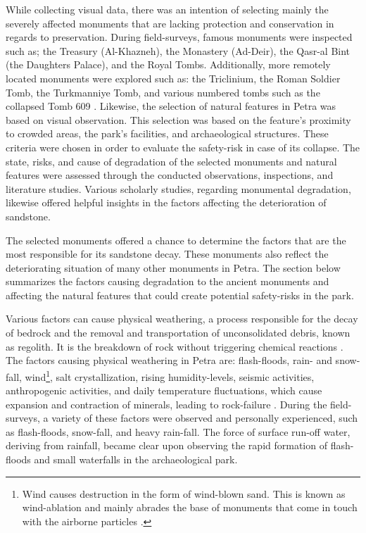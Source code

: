 While collecting visual data, there was an intention of selecting mainly the severely affected monuments that are lacking protection and conservation in regards to preservation.
During field-surveys, famous monuments were inspected such as; the Treasury (Al-Khazneh), the Monastery (Ad-Deir), the Qasr-al Bint (the Daughters Palace), and the Royal Tombs.
Additionally, more remotely located monuments were explored such as: the Triclinium, the Roman Soldier Tomb, the Turkmanniye Tomb, and various numbered tombs such as the collapsed Tomb 609 .
Likewise, the selection of natural features in Petra was based on visual observation. This selection was based on the feature’s proximity to crowded areas, the park’s facilities, and archaeological structures.
These criteria were chosen in order to evaluate the safety-risk in case of its collapse.
The state, risks, and cause of degradation of the selected monuments and natural features were assessed through the conducted observations, inspections, and literature studies.
Various scholarly studies, regarding monumental degradation, likewise offered helpful insights in the factors affecting the deterioration of sandstone. 

The  selected monuments offered a chance to determine the factors that are the most responsible for its sandstone decay.
These monuments also reflect the deteriorating situation of many other monuments in Petra.
The section below summarizes the factors causing degradation to the ancient monuments and affecting the natural features that could create potential safety-risks in the park.

Various  factors can cause physical weathering, a process responsible for the decay of bedrock and the removal and transportation of unconsolidated debris, known as regolith.
It is the breakdown of rock without triggering chemical reactions \parencite[90--92]{nichols2009}.
The factors causing physical weathering in Petra are: flash-floods, rain- and snow-fall, wind\footnote{Wind causes destruction in the form of wind-blown sand. This is known as wind-ablation and mainly abrades the base of monuments that come in touch with the airborne particles \parencite[267--284]{balaawi2011}.}, salt crystallization,
rising humidity-levels, seismic activities, anthropogenic activities, and daily temperature fluctuations, which cause expansion and
contraction of minerals, leading to rock-failure \parencites[126]{alshawabkehy2010}[667--669]{heinrichs2008}[90--97]{nichols2009}[12--14]{paolini2012}[66]{usicomos1996}.
During the field-surveys, a variety of these factors were observed and personally experienced, such as flash-floods, snow-fall, and heavy rain-fall.
The force of surface run-off water, deriving from rainfall, became clear upon observing the rapid formation of flash-floods and small waterfalls in the archaeological park. 

